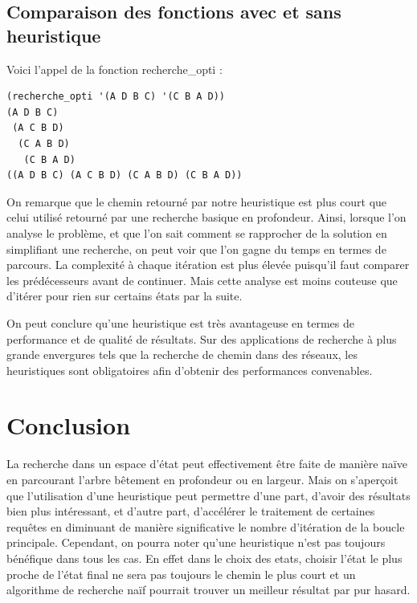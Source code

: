 \documentclass[a4paper,10pt]{report}
\begin{document}
  \section{Comparaison des fonctions avec et sans heuristique }
  
  Voici l’appel de la fonction recherche\_opti :
\begin{lstlisting}[language=Lisp]
(recherche_opti '(A D B C) '(C B A D))
(A D B C)
 (A C B D)
  (C A B D)
   (C B A D)
((A D B C) (A C B D) (C A B D) (C B A D))
\end{lstlisting}

On remarque que le chemin retourné par notre heuristique est plus court que celui utilisé retourné par une recherche basique en profondeur.
Ainsi, lorsque l’on analyse le problème, et que l’on sait comment se rapprocher de la solution en simplifiant une recherche, on peut voir que l’on gagne du temps en termes de parcours. La complexité à chaque itération est plus élevée puisqu’il faut comparer les prédécesseurs avant de continuer. Mais cette analyse est moins couteuse que d’itérer pour rien sur certains états par la suite.

On peut conclure qu’une heuristique est très avantageuse en termes de performance et de qualité de résultats. Sur des applications de recherche à plus grande envergures tels que la recherche de chemin dans des réseaux, les heuristiques sont obligatoires afin d’obtenir des performances convenables.

\chapter*{Conclusion}

  La recherche dans un espace d'état peut effectivement être faite de manière naïve en parcourant l'arbre bêtement en profondeur ou en largeur. Mais on s'aperçoit
  que l'utilisation d'une heuristique peut permettre d'une part, d'avoir des résultats bien plus intéressant, et d'autre part, d'accélérer le traitement de certaines 
  requêtes en diminuant de manière significative le nombre d'itération de la boucle principale. \newline 
  Cependant, on pourra noter qu'une heuristique n'est pas toujours bénéfique dans tous les cas. En effet dans le choix des etats, choisir l'état le plus proche de 
  l'état final ne sera pas toujours le chemin le plus court et un algorithme de recherche naïf pourrait trouver un meilleur résultat par pur hasard.
  
  
\end{document}
